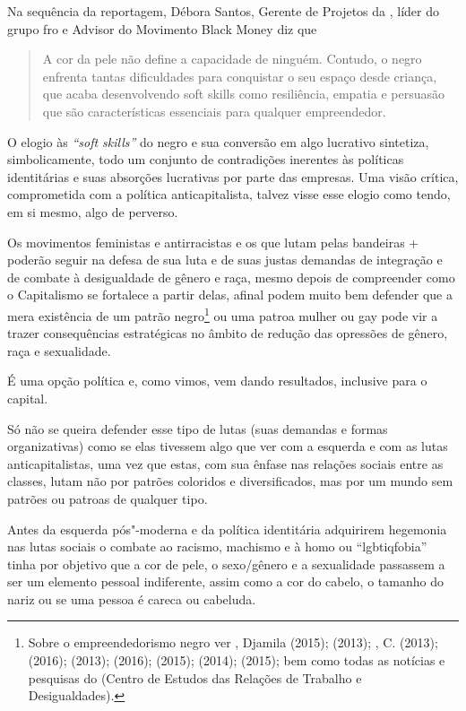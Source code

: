 Na sequência da reportagem, Débora Santos, Gerente de Projetos da ,
líder do grupo fro e Advisor do Movimento Black Money diz que

\begin{quote}
A cor da pele não define a capacidade de ninguém. Contudo, o negro
enfrenta tantas dificuldades para conquistar o seu espaço desde criança,
que acaba desenvolvendo soft skills como resiliência, empatia e
persuasão que são características essenciais para qualquer empreendedor.
\end{quote}

O elogio às \emph{``soft skills''} do negro e sua conversão em algo
lucrativo sintetiza, simbolicamente, todo um conjunto de contradições
inerentes às políticas identitárias e suas absorções lucrativas por
parte das empresas. Uma visão crítica, comprometida com a política
anticapitalista, talvez visse esse elogio como tendo, em si mesmo, algo
de perverso.

Os movimentos feministas e antirracistas e os que lutam pelas bandeiras
+ poderão seguir na defesa de sua luta e de suas justas demandas
de integração e de combate à desigualdade de gênero e raça, mesmo depois
de compreender como o Capitalismo se fortalece a partir delas, afinal
podem muito bem defender que a mera existência de um patrão
negro\footnote{Sobre o empreendedorismo negro ver , Djamila
  (2015);  (2013); , C. (2013); 
  (2016);  (2013);  (2016);  (2015); 
  (2014);  (2015); bem como todas as notícias e pesquisas do 
  (Centro de Estudos das Relações de Trabalho e Desigualdades).} ou uma
patroa mulher ou gay pode vir a trazer consequências estratégicas no
âmbito de redução das opressões de gênero, raça e sexualidade.

É uma opção política e, como vimos, vem dando resultados, inclusive para
o capital.

Só não se queira defender esse tipo de lutas (suas demandas e formas
organizativas) como se elas tivessem algo que ver com a esquerda e com
as lutas anticapitalistas, uma vez que estas, com sua ênfase nas
relações sociais entre as classes, lutam não por patrões coloridos e
diversificados, mas por um mundo sem patrões ou patroas de qualquer
tipo.

Antes da esquerda pós"-moderna e da política identitária adquirirem
hegemonia nas lutas sociais o combate ao racismo, machismo e à homo ou
``lgbtiqfobia'' tinha por objetivo que a cor de pele, o sexo/gênero e a
sexualidade passassem a ser um elemento pessoal indiferente, assim como
a cor do cabelo, o tamanho do nariz ou se uma pessoa é careca ou
cabeluda.


